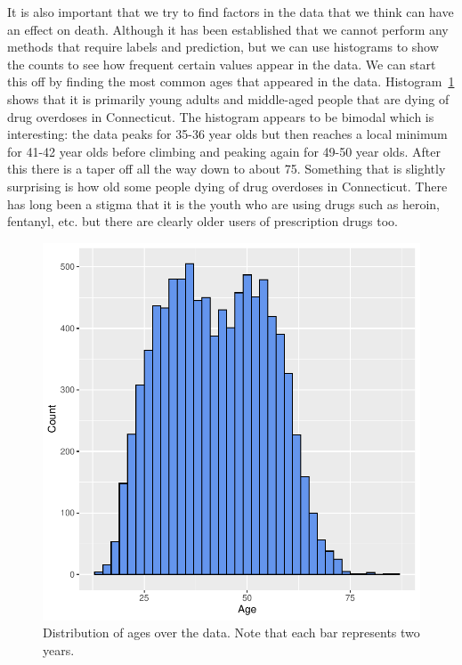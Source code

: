 \documentclass[12pt, letterpaper, titlepage]{article}
\begin{document}
It is also important that we try to find factors in the data that we think can have an effect on death.  Although it has been established that we cannot perform any methods that require labels and prediction, but we can use histograms to show the counts to see how frequent certain values appear in the data.  We can start this off by finding the most common ages that appeared in the data.  Histogram~\ref{fig:AgeHist} shows that it is primarily young adults and middle-aged people that are dying of drug overdoses in Connecticut.  The histogram appears to be bimodal which is interesting: the data peaks for 35-36 year olds but then reaches a local minimum for 41-42 year olds before climbing and peaking again for 49-50 year olds.  After this there is a taper off all the way down to about 75.  Something that is slightly surprising is how old some people dying of drug overdoses in Connecticut.  There has long been a stigma that it is the youth who are using drugs such as heroin, fentanyl, etc. but there are clearly older users of prescription drugs too.

\begin{figure}[tbp]
    \centering
    \includegraphics{MoneyHistogram}
    \caption{Distribution of ages over the data. Note that each bar represents two years.}
    \label{fig:AgeHist}
  \end{figure}
\end{document}
